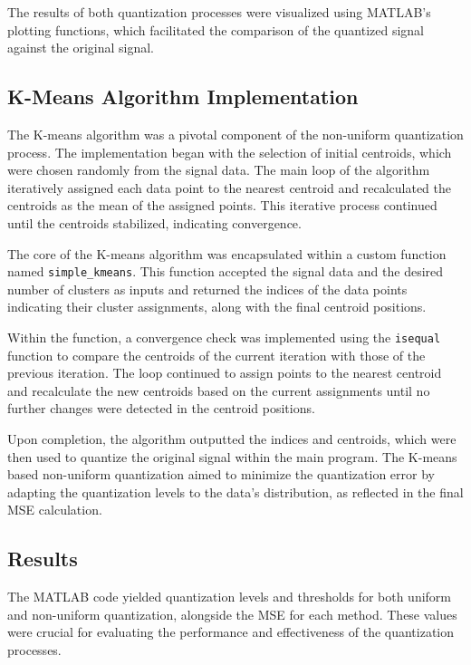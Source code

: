\documentclass[11pt]{article}
\begin{document}
The results of both quantization processes were visualized using MATLAB's plotting functions, which facilitated the comparison of the quantized signal against the original signal.

\subsection{K-Means Algorithm Implementation}
The K-means algorithm was a pivotal component of the non-uniform quantization process. The implementation began with the selection of initial centroids, which were chosen randomly from the signal data. The main loop of the algorithm iteratively assigned each data point to the nearest centroid and recalculated the centroids as the mean of the assigned points. This iterative process continued until the centroids stabilized, indicating convergence.
\newline

The core of the K-means algorithm was encapsulated within a custom function named \texttt{simple\_kmeans}. This function accepted the signal data and the desired number of clusters as inputs and returned the indices of the data points indicating their cluster assignments, along with the final centroid positions.
\newline

Within the function, a convergence check was implemented using the \texttt{isequal} function to compare the centroids of the current iteration with those of the previous iteration. The loop continued to assign points to the nearest centroid and recalculate the new centroids based on the current assignments until no further changes were detected in the centroid positions.
\newline

Upon completion, the algorithm outputted the indices and centroids, which were then used to quantize the original signal within the main program. The K-means based non-uniform quantization aimed to minimize the quantization error by adapting the quantization levels to the data's distribution, as reflected in the final MSE calculation.

\subsection{Results}
The MATLAB code yielded quantization levels and thresholds for both uniform and non-uniform quantization, alongside the MSE for each method. These values were crucial for evaluating the performance and effectiveness of the quantization processes.
\end{document}
